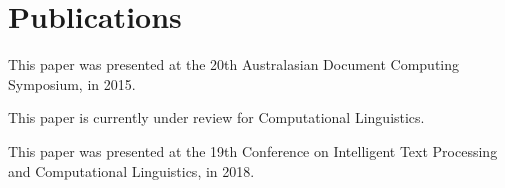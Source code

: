 \documentclass{book}
\begin{document}
\part{Publications}
%
%
%
%
%




\begin{preamble}
	This paper was presented at the 20th Australasian Document Computing Symposium, in 2015.
\end{preamble}

\begin{preamble}
	This paper is currently under review for Computational Linguistics.
\end{preamble}


\begin{preamble}
	This paper was presented at the 19th Conference on Intelligent Text Processing and Computational Linguistics, in 2018.
\end{preamble}
\end{document}
